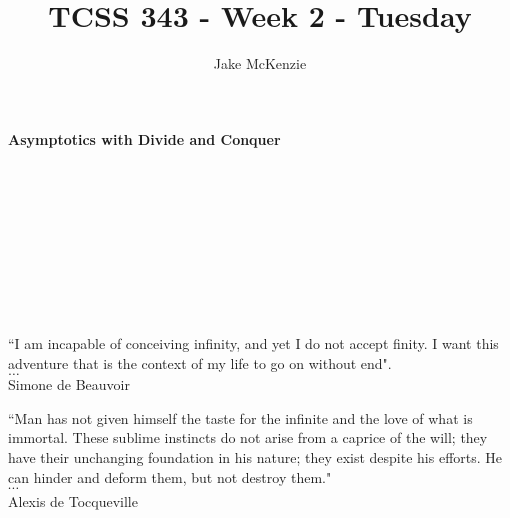 \documentclass[12pt]{article}
\begin{document}
\title{TCSS 343 - Week 2 - Tuesday}
\author{Jake McKenzie}
\maketitle
\noindent\centerline{\textbf{Asymptotics with Divide and Conquer}}\\\\\\\\\\\\\\\\
\begin{center}
    ``I am incapable of conceiving infinity, and yet I do not accept finity. I want this adventure that is the context of my life to go on without end". \\$\dots$\\ Simone de Beauvoir
\end{center}
\begin{center}
    ``Man has not given himself the taste for the infinite and the love of what is immortal. These sublime instincts do not arise from a caprice of the will; they have their unchanging foundation in his nature; they exist despite his efforts. He can hinder and deform them, but not destroy them."\\
    $\cdots$\\
    Alexis de Tocqueville
\end{center}
\newpage
\end{document}
